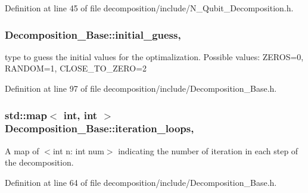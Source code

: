 Definition at line 45 of file decomposition/include/\+N\+\_\+\+Qubit\+\_\+\+Decomposition.\+h.

\subsubsection[{\texorpdfstring{initial\+\_\+guess}{initial_guess}}]{ Decomposition\+\_\+\+Base\+::initial\+\_\+guess\hspace{0.3cm}{\ttfamily [protected]}, {\ttfamily [inherited]}}\hypertarget{class_decomposition___base_ad8df090247ebaea3ebb69e7737b194b9}{}\label{class_decomposition___base_ad8df090247ebaea3ebb69e7737b194b9}


type to guess the initial values for the optimalization. Possible values\+: Z\+E\+R\+OS=0, R\+A\+N\+D\+OM=1, C\+L\+O\+S\+E\+\_\+\+T\+O\+\_\+\+Z\+E\+RO=2 



Definition at line 97 of file decomposition/include/\+Decomposition\+\_\+\+Base.\+h.

\subsubsection[{\texorpdfstring{iteration\+\_\+loops}{iteration_loops}}]{\setlength{\rightskip}{0pt plus 5cm}std\+::map$<$ int, int $>$ Decomposition\+\_\+\+Base\+::iteration\+\_\+loops\hspace{0.3cm}{\ttfamily [protected]}, {\ttfamily [inherited]}}\hypertarget{class_decomposition___base_aa6f08845d47e18b6e6739b46d8fe35eb}{}\label{class_decomposition___base_aa6f08845d47e18b6e6739b46d8fe35eb}


A map of $<$int n\+: int num$>$ indicating the number of iteration in each step of the decomposition. 



Definition at line 64 of file decomposition/include/\+Decomposition\+\_\+\+Base.\+h.

